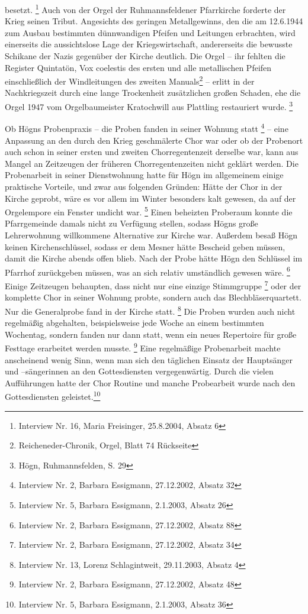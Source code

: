 besetzt. \footnote{Interview Nr. 16, Maria Freisinger, 25.8.2004,
Absatz 6} Auch von der Orgel der Ruhmannsfeldener Pfarrkirche forderte
der Krieg seinen Tribut. Angesichts des geringen Metallgewinns, den die
am 12.6.1944 zum Ausbau bestimmten dünnwandigen Pfeifen und Leitungen
erbrachten, wird einerseits die aussichtslose Lage der
Kriegswirtschaft, andererseits die bewusste Schikane der Nazis
gegenüber der Kirche deutlich. Die Orgel – ihr fehlten die Register
Quintatön, Vox coelestis des ersten und alle metallischen Pfeifen
einschließlich der Windleitungen des zweiten Manuals\footnote{
Reicheneder-Chronik, Orgel, Blatt 74 Rückseite} – erlitt in der
Nachkriegszeit durch eine lange Trockenheit zusätzlichen großen
Schaden, ehe die Orgel 1947 vom Orgelbaumeister Kratochwill aus
Plattling restauriert wurde. \footnote{Högn, Ruhmannsfelden, S. 29}

Ob Högns Probenpraxis – die Proben fanden in seiner Wohnung
statt \footnote{Interview Nr. 2, Barbara Essigmann, 27.12.2002, Absatz
32} – eine Anpassung an den durch den Krieg geschmälerte Chor war oder
ob der Probenort auch schon in seiner ersten und zweiten
Chorregentenzeit derselbe war, kann aus Mangel an Zeitzeugen der
früheren Chorregentenzeiten nicht geklärt werden. Die Probenarbeit in
seiner Dienstwohnung hatte für Högn im allgemeinem einige praktische
Vorteile, und zwar aus folgenden Gründen: Hätte der Chor in der Kirche
geprobt, wäre es vor allem im Winter besonders kalt gewesen, da auf der
Orgelempore ein Fenster undicht war. \footnote{Interview Nr. 5, Barbara
Essigmann, 2.1.2003, Absatz 26} Einen beheizten Proberaum konnte die
Pfarrgemeinde damals nicht zu Verfügung stellen, sodass Högns große
Lehrerwohnung willkommene Alternative zur Kirche war. Außerdem besaß
Högn keinen Kirchenschlüssel, sodass er dem Mesner hätte Bescheid geben
müssen, damit die Kirche abends offen blieb. Nach der Probe hätte Högn
den Schlüssel im Pfarrhof zurückgeben müssen, was an sich relativ
umständlich gewesen wäre. \footnote{Interview Nr. 2, Barbara Essigmann,
27.12.2002, Absatz 88} Einige Zeitzeugen behaupten, dass nicht nur eine
einzige Stimmgruppe \footnote{Interview Nr. 2, Barbara Essigmann,
27.12.2002, Absatz 34} oder der komplette Chor in seiner Wohnung
probte, sondern auch das Blechbläserquartett. Nur die Generalprobe fand
in der Kirche statt. \footnote{Interview Nr. 13, Lorenz Schlagintweit,
29.11.2003, Absatz 4} Die Proben wurden auch nicht regelmäßig
abgehalten, beispielsweise jede Woche an einem bestimmten Wochentag,
sondern fanden nur dann statt, wenn ein neues Repertoire für große
Festtage erarbeitet werden musste. \footnote{Interview Nr. 2, Barbara
Essigmann, 27.12.2002, Absatz 48} Eine regelmäßige Probenarbeit machte
anscheinend wenig Sinn, wenn man sich den täglichen Einsatz der
Hauptsänger und –sängerinnen an den Gottesdiensten vergegenwärtig.
Durch die vielen Aufführungen hatte der Chor Routine und manche
Probearbeit wurde nach den Gottesdiensten geleistet.\footnote{
Interview Nr. 5, Barbara Essigmann, 2.1.2003, Absatz 36}

